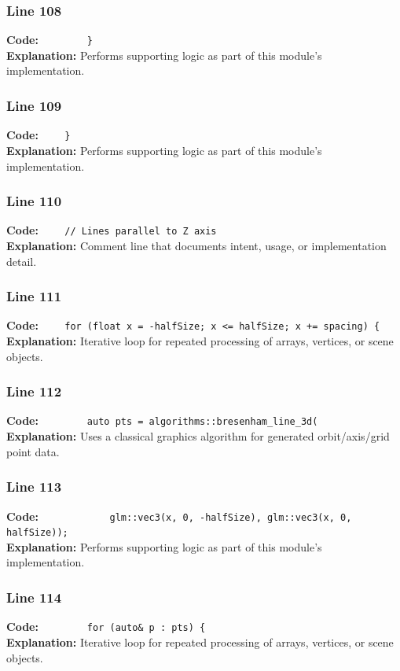 \documentclass[11pt,a4paper]{article}
\begin{document}
\subsubsection*{Line 108}
\textbf{Code:} \verb|        }|\\
\textbf{Explanation:} Performs supporting logic as part of this module's implementation.

\subsubsection*{Line 109}
\textbf{Code:} \verb|    }|\\
\textbf{Explanation:} Performs supporting logic as part of this module's implementation.

\subsubsection*{Line 110}
\textbf{Code:} \verb|    // Lines parallel to Z axis|\\
\textbf{Explanation:} Comment line that documents intent, usage, or implementation detail.

\subsubsection*{Line 111}
\textbf{Code:} \verb|    for (float x = -halfSize; x <= halfSize; x += spacing) {|\\
\textbf{Explanation:} Iterative loop for repeated processing of arrays, vertices, or scene objects.

\subsubsection*{Line 112}
\textbf{Code:} \verb|        auto pts = algorithms::bresenham_line_3d(|\\
\textbf{Explanation:} Uses a classical graphics algorithm for generated orbit/axis/grid point data.

\subsubsection*{Line 113}
\textbf{Code:} \verb|            glm::vec3(x, 0, -halfSize), glm::vec3(x, 0, halfSize));|\\
\textbf{Explanation:} Performs supporting logic as part of this module's implementation.

\subsubsection*{Line 114}
\textbf{Code:} \verb|        for (auto& p : pts) {|\\
\textbf{Explanation:} Iterative loop for repeated processing of arrays, vertices, or scene objects.
\end{document}
